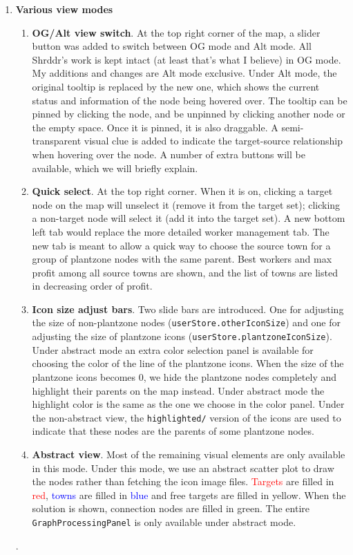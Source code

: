 \documentclass[11pt]{article}
\theoremstyle{definition}
\theoremstyle{remark}
\begin{document}
\begin{enumerate}
    \item[$\bullet$] \textbf{Various view modes}
    \begin{enumerate}
        \item[$\circ$] \textbf{OG/Alt view switch}. At the top right corner of the map, a slider button was added to switch between OG mode and Alt mode. All Shrddr's work is kept intact (at least that's what I believe) in OG mode. My additions and changes are Alt mode exclusive. Under Alt mode, the original tooltip is replaced by the new one, which shows the current status and information of the node being hovered over. The tooltip can be pinned by clicking the node, and be unpinned by clicking another node or the empty space. Once it is pinned, it is also draggable. A semi-transparent visual clue is added to indicate the target-source relationship when hovering over the node. A number of extra buttons will be available, which we will briefly explain.

        \item[$\circ$] \textbf{Quick select}. At the top right corner. When it is on, clicking a target node on the map will unselect it (remove it from the target set); clicking a non-target node will select it (add it into the target set). A new bottom left tab would replace the more detailed worker management tab. The new tab is meant to allow a quick way to choose the source town for a group of plantzone nodes with the same parent. Best workers and max profit among all source towns are shown, and the list of towns are listed in decreasing order of profit.

        \item[$\circ$] \textbf{Icon size adjust bars}. Two slide bars are introduced. One for adjusting the size of non-plantzone nodes (\texttt{userStore.otherIconSize}) and one for adjusting the size of plantzone icons (\texttt{userStore.plantzoneIconSize}). Under abstract mode an extra color selection panel is available for choosing the color of the line of the plantzone icons. When the size of the plantzone icons becomes 0, we hide the plantzone nodes completely and highlight their parents on the map instead. Under abstract mode the highlight color is the same as the one we choose in the color panel. Under the non-abstract view, the \texttt{highlighted/} version of the icons are used to indicate that these nodes are the parents of some plantzone nodes.

        \item[$\circ$] \textbf{Abstract view}. Most of the remaining visual elements are only available in this mode. Under this mode, we use an abstract scatter plot to draw the nodes rather than fetching the icon image files. \textcolor{red}{Targets} are filled in \textcolor{red}{red}, \textcolor{blue}{towns} are filled in \textcolor{blue}{blue} and \textcolor{myorange}{free targets} are filled in \textcolor{myorange}{yellow}. When the solution is shown, \textcolor{mygreen}{connection nodes} are filled in \textcolor{mygreen}{green}. The entire \texttt{GraphProcessingPanel} is only available under abstract mode.
    \end{enumerate}.


\end{enumerate}
\end{document}
